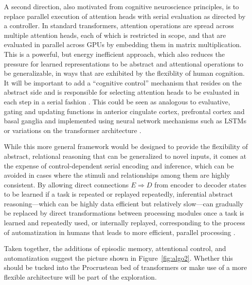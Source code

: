 A second direction, also motivated from cognitive neuroscience principles, is to replace 
parallel execution of attention heads with serial evaluation as directed by a controller. 
In standard transformers, attention operations are spread across multiple attention heads,
each of which is restricted in scope, and that are evaluated in parallel across GPUs by embedding them in matrix
multiplication. This is a powerful, but energy inefficient approach, which also reduces the pressure for learned
representations to be abstract and attentional operations to be generalizable, in ways that are exhibited
by the flexiblity of human cognition.  It will be important to add a ``cognitive control'' mechanism that resides on
the abstract side and is responsible for selecting attention heads to be evaluated in each step in a serial fashion \citep{cohen2017cognitive}.  This could be seen as analogous to evaluative, gating and updating functions in anterior cingulate cortex, prefrontal cortex and basal ganglia
\citep{frank2001interactions,evc,braver2000control,wmPFC}
and implemented using neural network mechanisms such as LSTMs \citep{lstm} or variations on the transformer
architecture \citep{gamr}.

While this more general framework would be designed to provide the flexibility of abstract, relational reasoning that
can be generalized to novel inputs, it comes at the expense of control-dependent serial encoding and inference, which can be avoided in cases where the stimuli and relationships among them are highly consistent. By allowing
direct connections $E \Rightarrow D$ from encoder to decoder states to be learned if a task is repeated or replayed
repeatedly, inferential abstract reasoning---which can be highly data efficient but relatively slow---can gradually
be replaced by direct transformations between processing modules once a task is learned and repeatedly used, or
internally replayed, corresponding to the process of automatization in humans that leads to more efficient, parallel
processing \citep{schneider1977controlled, ravi2020navigating, musslick2021rationalizing}.  

Taken together, the additions of episodic memory, attentional control, and automatization suggest the picture shown in Figure~\ref{fig:algo2}. Whether this should be tucked into the Procrustean bed of transformers or make use of a more flexible architecture will be part of the exploration.


